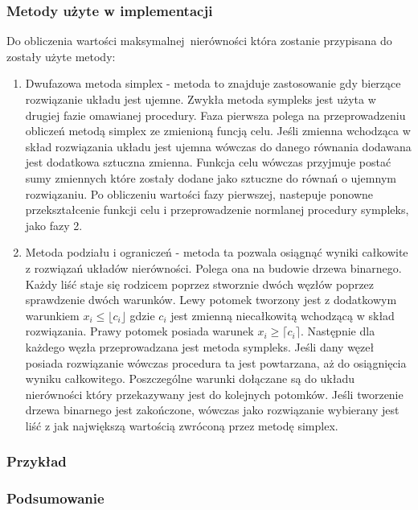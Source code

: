 \subsubsection{Metody użyte w implementacji}

Do obliczenia wartości maksymalnej nierówności która zostanie przypisana do  zostały użyte metody:
\begin{enumerate}
  \item Dwufazowa metoda simplex - metoda to znajduje zastosowanie gdy bierzące rozwiązanie układu jest ujemne. Zwykła metoda sympleks jest użyta w drugiej fazie omawianej procedury. Faza pierwsza polega na przeprowadzeniu obliczeń metodą simplex ze zmienioną funcją celu. Jeśli zmienna wchodząca w skład rozwiązania układu jest ujemna wówczas do danego równania dodawana jest dodatkowa sztuczna zmienna. Funkcja celu wówczas przyjmuje postać sumy zmiennych które zostały dodane jako sztuczne do równań o ujemnym rozwiązaniu. Po obliczeniu wartości fazy pierwszej, nastepuje ponowne przekształcenie funkcji celu i przeprowadzenie normlanej procedury sympleks, jako fazy 2.
  \item Metoda podziału i ograniczeń - metoda ta pozwala osiągnąć wyniki całkowite z rozwiązań układów nierówności. Polega ona na budowie drzewa binarnego. Każdy liść staje się rodzicem poprzez stworznie dwóch węzłów poprzez sprawdzenie dwóch warunków. Lewy potomek tworzony jest z dodatkowym warunkiem $x_i \le \lfloor c_i \rfloor$ gdzie $c_i$ jest zmienną niecałkowitą wchodzącą w skład rozwiązania. Prawy potomek posiada warunek $x_i \ge \lceil c_i \rceil$. Następnie dla każdego węzła przeprowadzana jest metoda sympleks. Jeśli dany węzeł posiada rozwiązanie wówczas procedura ta jest powtarzana, aż do osiągnięcia wyniku całkowitego. Poszczególne warunki dołączane są do układu nierówności który przekazywany jest do kolejnych potomków. Jeśli tworzenie drzewa binarnego jest zakończone, wówczas jako rozwiązanie wybierany jest liść z jak największą wartością zwróconą przez metodę simplex.
\end{enumerate}

\subsubsection{Przykład}

\subsubsection{Podsumowanie}

